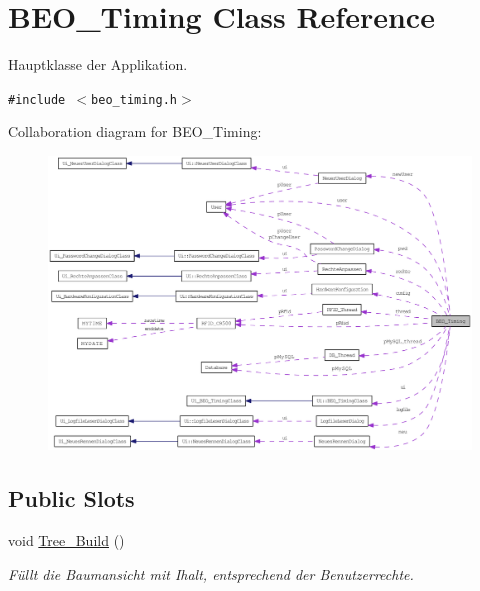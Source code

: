 \hypertarget{class_b_e_o___timing}{
\section{BEO\_\-Timing Class Reference}
\label{class_b_e_o___timing}
}
Hauptklasse der Applikation.  


{\tt \#include $<$beo\_\-timing.h$>$}

Collaboration diagram for BEO\_\-Timing:\nopagebreak
\begin{figure}[H]
\begin{center}
\leavevmode
\includegraphics[width=400pt]{class_b_e_o___timing__coll__graph}
\end{center}
\end{figure}
\subsection*{Public Slots}
\begin{CompactItemize}
\item 
void \hyperlink{class_b_e_o___timing_454b16d1cfe5763b0812114e82108e55}{Tree\_\-Build} ()
\begin{CompactList}\small\item\em Füllt die Baumansicht mit Ihalt, entsprechend der Benutzerrechte. \item\end{CompactList}\end{CompactItemize}
